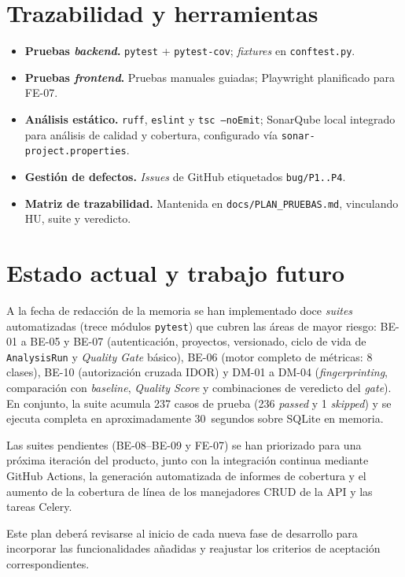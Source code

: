 \section{Trazabilidad y herramientas}
\label{sec:anx-pruebas-trazabilidad}

\begin{itemize}
  \item \textbf{Pruebas \emph{backend}.}  \texttt{pytest} +
        \texttt{pytest-cov}; \emph{fixtures} en \texttt{conftest.py}.
  \item \textbf{Pruebas \emph{frontend}.}  Pruebas manuales guiadas;
        Playwright planificado para FE-07.
  \item \textbf{Análisis estático.}  \texttt{ruff}, \texttt{eslint} y
        \texttt{tsc --noEmit}; SonarQube local integrado para análisis de calidad y cobertura, configurado vía
        \texttt{sonar-project.properties}.
  \item \textbf{Gestión de defectos.}  \emph{Issues} de GitHub etiquetados
        \texttt{bug/P1..P4}.
  \item \textbf{Matriz de trazabilidad.}  Mantenida en
        \texttt{docs/PLAN\_PRUEBAS.md}, vinculando \acs{HU}, suite y
        veredicto.
\end{itemize}


\section{Estado actual y trabajo futuro}
\label{sec:anx-pruebas-estado}

A la fecha de redacción de la memoria se han implementado doce
\emph{suites} automatizadas (trece módulos \texttt{pytest}) que cubren las áreas de mayor riesgo:
BE-01 a BE-05 y BE-07 (autenticación, proyectos, versionado, ciclo de vida de \texttt{AnalysisRun} y \emph{Quality
Gate} básico), BE-06 (motor completo de métricas: 8 clases), BE-10
(autorización cruzada \acs{IDOR}) y DM-01 a DM-04
(\emph{fingerprinting}, comparación con \emph{baseline}, \emph{Quality
Score} y combinaciones de veredicto del \emph{gate}).  En conjunto,
la suite acumula 237 casos de prueba (236 \emph{passed} y 1
\emph{skipped}) y se ejecuta completa en aproximadamente 30~segundos
sobre SQLite en memoria.

Las suites pendientes (BE-08--BE-09 y FE-07) se han priorizado para
una próxima iteración del producto, junto con la integración continua
mediante GitHub Actions, la generación automatizada de informes de
cobertura y el aumento de la cobertura de línea de los manejadores
\acs{CRUD} de la \acs{API} y las tareas Celery.

Este plan deberá revisarse al inicio de cada nueva fase de desarrollo
para incorporar las funcionalidades añadidas y reajustar los criterios
de aceptación correspondientes.
